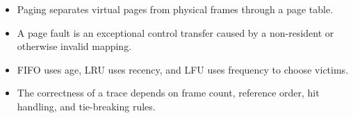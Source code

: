 \begin{chapterrecap}
\begin{itemize}
  \item Paging separates virtual pages from physical frames through a page table.
  \item A page fault is an exceptional control transfer caused by a non-resident or otherwise invalid mapping.
  \item FIFO uses age, LRU uses recency, and LFU uses frequency to choose victims.
  \item The correctness of a trace depends on frame count, reference order, hit handling, and tie-breaking rules.
\end{itemize}
\end{chapterrecap}

